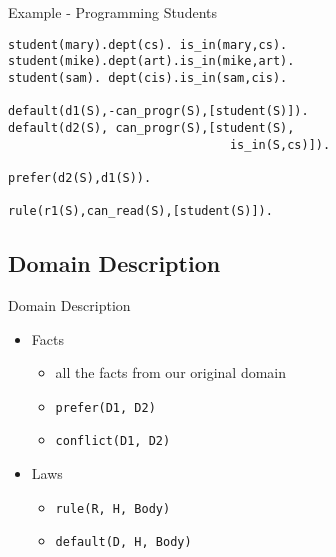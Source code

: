 \documentclass{beamer}
\begin{document}
  \begin{frame}{Example - Programming Students}
    \begin{alltt}
student(mary). dept(cs). \ is\_in(mary,cs). \\
student(mike). dept(art). is\_in(mike,art).\\
student(sam). \ dept(cis). is\_in(sam,cis). \\ ~ \\
default(d1(S), -can\_progr(S), [student(S)]). \\
default(d2(S), \ can\_progr(S), [student(S), \\
\ \ \ \ \ \ \ \ \ \ \ \ \ \ \ \ \ \ \ \ \ \ \ \ \ \ \ \ \ \ \ is\_in(S,cs)]).\\ ~ \\
prefer(d2(S), d1(S)). \\ ~ \\
rule(r1(S), can\_read(S), [student(S)]).
    \end{alltt}
  \end{frame}

  \subsection{Domain Description}
  
  \begin{frame}{Domain Description}
      \begin{itemize}
        \item Facts 
        \begin{itemize}
          \item all the facts from our original domain
          \item \texttt{prefer(D1, D2)} 
          \item \texttt{conflict(D1, D2)}
        \end{itemize}
        \item Laws
        \begin{itemize}
          \item \texttt{rule(R, H, Body)} 
          \item \texttt{default(D, H, Body)}
        \end{itemize}
      \end{itemize}
  \end{frame}
\end{document}
